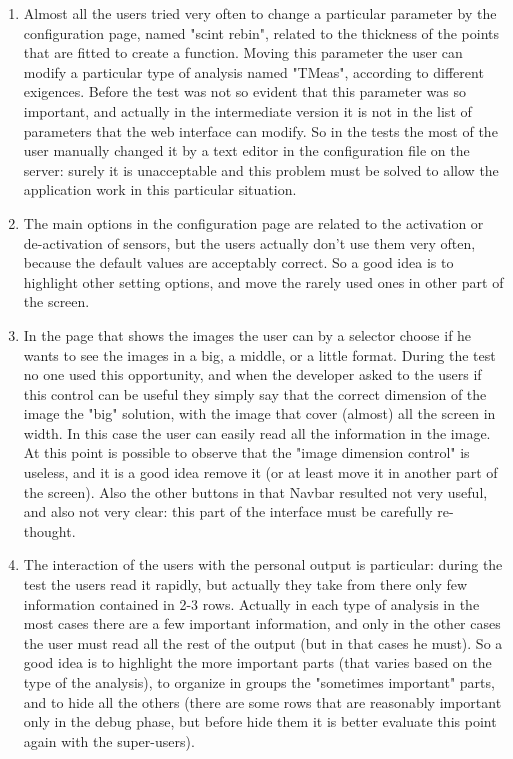 \begin{enumerate}

\item
Almost all the users tried very often to change a particular parameter by the configuration page, named "scint rebin", related to the thickness of the points that are fitted to create a function. Moving this parameter the user can modify a particular type of analysis named "TMeas", according to different exigences. Before the test was not so evident that this parameter was so important, and actually in the intermediate version it is not in the list of parameters that the web interface can modify. So in the tests the most of the user manually changed it by a text editor in the configuration file on the server: surely it is unacceptable and this problem must be solved to allow the application work in this particular situation.

\item 
The main options in the configuration page are related to the activation or de-activation of sensors, but the users actually don't use them very often, because  the default values are acceptably correct. So a good idea is to highlight other setting options, and move the rarely used ones in other part of the screen.

\item
In the page that shows the images the user can by a selector choose if he wants to see the images in a big, a middle, or a little format. During the test no one used this opportunity, and when the developer asked to the users if this control can be useful they simply say that the correct dimension of the image the "big" solution, with the image that cover (almost) all the screen in width. In this case the user can easily read all the information in the image. At this point is possible to observe that the "image dimension control" is useless, and it is a good idea remove it (or at least move it in another part of the screen). Also the other buttons in that Navbar resulted not very useful, and also not very clear: this part of the interface must be carefully re-thought.   


\item
The interaction of the users with the personal output is particular: during the test the users read it rapidly, but actually they take from there only few information contained in 2-3 rows. Actually in each type of analysis in the most cases there are a few important information, and only in the other cases the user must read all the rest of the output (but in that cases he must). So a good idea is to highlight the more important parts (that varies based on the type of the analysis), to organize in groups the "sometimes important" parts, and to hide all the others (there are some rows that are reasonably important only in the debug phase, but before hide them it is better evaluate this point again with the super-users).


\end{enumerate}
